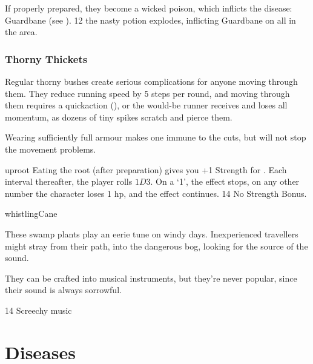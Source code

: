 \begin{multicols}{2}
{  If properly prepared, they become a wicked poison, which inflicts the disease: Guardbane (see ).
    }
  {}%
  {12}%
  {the nasty potion explodes, inflicting Guardbane on all in the \gls{area}.}%

\subsubsection{Thorny Thickets}
\label{thorny_thickets}

Regular thorny bushes create serious complications for anyone moving through them.
They reduce running speed by 5 \glspl{step} per round, and moving through them requires a  \gls{quickaction} (\tn[10]), or the would-be runner receives  and loses all momentum, as dozens of tiny spikes scratch and pierce them.

Wearing sufficiently full armour makes one immune to the cuts, but will not stop the movement problems.

%
  {uproot}%
  {
  Eating the root (after preparation) gives you +1 Strength for .
  Each \gls{interval} thereafter, the player rolls $1D3$.
  On a `1', the effect stops, on any other number the character loses 1 \gls{hp}, and the effect continues.
    }
{}%
{14}%
{No Strength Bonus.}%

%
  {whistlingCane}%
  {
  These swamp plants play an eerie tune on windy days.
  Inexperienced travellers might stray from their path, into the dangerous bog, looking for the source of the sound.

  They can be crafted into musical instruments, but they're never popular, since their sound is always sorrowful.
  }
{}%
{14}%
{Screechy music}%

\end{multicols}

\section{Diseases}
\label{diseases}

\newcommand\disease[5][\roll{Intelligence}{Medicine}]{
  \subsubsection{#2}
  \index{#2 \glsentrytext{sickness}}
  \label{#2}
  #3
  \needspace{2em}
  \begin{description}
    \item[\flwr~\Glspl{ingredient}] #4
    \item[Roll] #1 (\tn[#5])
  \end{description}
}

